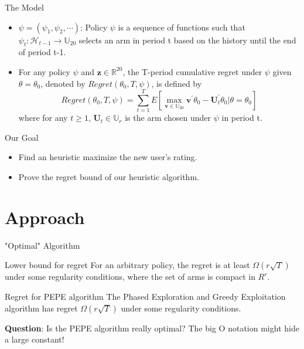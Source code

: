 \documentclass[serif]{beamer}
\begin{document}
\begin{frame}{The Model}
\begin{itemize}
\item<1-> $\psi=(\psi_{1},\psi_{2},\cdots)$: Policy $\psi$ is a sequence of functions such that $\psi_{t}:\mathscr{H}_{t-1}\rightarrow \mathbb{U}_{20}$ selects an arm in period t based on the history until the end of period t-1.
\item<2-> For any policy $\psi$ and $\textbf{z}\in \mathbb{R}^{20}$, the T-period cumulative regret under $\psi$ given $\theta=\theta_{0}$, denoted by $Regret(\theta_{0},T,\psi)$, is defined by
\begin{equation}
Regret(\theta_{0},T,\psi)=\sum_{t=1}^{T}E\left[\max_{\textbf{v}\in \mathbb{U}_{20}}\textbf{v}^{'}\theta_{0}-\textbf{U}_{t}^{'}\theta_{0}|\theta=\theta_{0}\right] \nonumber
\end{equation}
where for any $t\geq 1$, $\textbf{U}_{t}\in \mathbb{U}_{r}$ is the arm chosen under $\psi$ in period t.


\end{itemize}
\end{frame}




\begin{frame}{Our Goal}
\begin{itemize}
\item<1-> Find an heuristic maximize the new user's rating.
\item<2-> Prove the regret bound of our heuristic algorithm.
\end{itemize}
\end{frame}


\section{Approach}
\tableofcontents[currentsection,subsectionstyle=hide]





\begin{frame}{"Optimal" Algorithm}
\begin{block}{Lower bound for regret}
For an arbitrary policy, the regret is at least $\Omega(r\sqrt{T})$ under some regularity conditions, where the set of arms is compact in $R^{r}$.
\end{block}

\begin{block}{Regret for PEPE algorithm}
The Phased Exploration and Greedy Exploitation algorithm has regret $\Omega(r\sqrt{T})$ under some regularity conditions.
\end{block}


\textbf{Question}: Is the PEPE algorithm really optimal? The big O notation might hide a large constant!
\end{frame}
\end{document}
